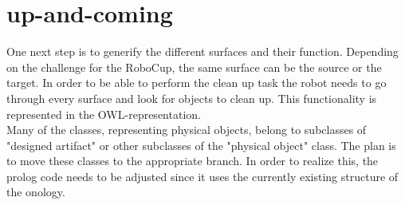 \documentclass[main.tex]{subfiles}
\begin{document}
		\section{up-and-coming}
		One next step is to generify the different surfaces and their function. Depending on the challenge for the RoboCup, the same surface can be the source or the target. In order to be able to perform the clean up task the robot needs to go through every surface and look for objects to clean up. This functionality is represented in the OWL-representation.\\
Many of the classes, representing physical objects, belong to subclasses of "designed artifact" or other subclasses of the "physical object" class. The plan is to move these classes to the appropriate branch. In order to realize this, the prolog code needs to be adjusted since it uses the currently existing structure of the onology.
\end{document}
